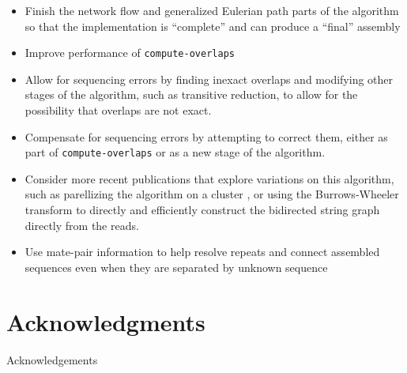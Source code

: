 \documentclass[10pt]{article}
\newcommand{\ProgramName}[1]{{\tt #1}}
\begin{document}
\begin{itemize}
\item Finish the network flow and generalized Eulerian path parts of the algorithm
so that the implementation is ``complete'' and can produce a ``final'' assembly
\item Improve performance of \ProgramName{compute-overlaps}
\item Allow for sequencing errors by finding inexact overlaps and modifying other
stages of the algorithm, such as transitive reduction, to allow for the
possibility that overlaps are not exact.
\item Compensate for sequencing errors by attempting to correct them, either as
part of \ProgramName{compute-overlaps} or as a new stage of the algorithm.
\item Consider more recent publications that explore variations on this algorithm,
such as parellizing the algorithm on a cluster \cite{X}, or using the
Burrows-Wheeler transform to directly and efficiently construct the bidirected
string graph directly from the reads\cite{X}.
\item Use mate-pair information to help resolve repeats and connect assembled
sequences even when they are separated by unknown sequence
\end{itemize}

\label{sec:mapping_contained_reads}

\section*{Acknowledgments}

Acknowledgements



\end{document}
